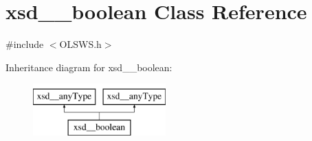 \hypertarget{classxsd____boolean}{
\section{xsd\_\-\_\-boolean Class Reference}
\label{classxsd____boolean}
}


{\ttfamily \#include $<$OLSWS.h$>$}

Inheritance diagram for xsd\_\-\_\-boolean:\begin{figure}[H]
\begin{center}
\leavevmode
\includegraphics[height=2.000000cm]{classxsd____boolean}
\end{center}
\end{figure}
